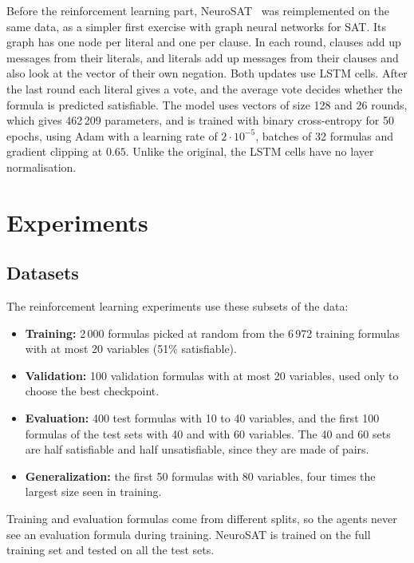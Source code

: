 \documentclass[11pt,a4paper]{article}
\begin{document}
Before the reinforcement learning part, NeuroSAT~\cite{selsam2019neurosat} was reimplemented on the same data, as a simpler first exercise with graph neural networks for SAT. Its graph has one node per literal and one per clause. In each round, clauses add up messages from their literals, and literals add up messages from their clauses and also look at the vector of their own negation. Both updates use LSTM cells. After the last round each literal gives a vote, and the average vote decides whether the formula is predicted satisfiable. The model uses vectors of size 128 and 26 rounds, which gives 462\,209 parameters, and is trained with binary cross-entropy for 50 epochs, using Adam with a learning rate of $2 \cdot 10^{-5}$, batches of 32 formulas and gradient clipping at $0.65$. Unlike the original, the LSTM cells have no layer normalisation.

\section{Experiments}
\label{sec:experiments}

\subsection{Datasets}

The reinforcement learning experiments use these subsets of the data:

\begin{itemize}
    \item \textbf{Training:} 2\,000 formulas picked at random from the 6\,972 training formulas with at most 20 variables (51\% satisfiable).
    \item \textbf{Validation:} 100 validation formulas with at most 20 variables, used only to choose the best checkpoint.
    \item \textbf{Evaluation:} 400 test formulas with 10 to 40 variables, and the first 100 formulas of the test sets with 40 and with 60 variables. The 40 and 60 sets are half satisfiable and half unsatisfiable, since they are made of pairs.
    \item \textbf{Generalization:} the first 50 formulas with 80 variables, four times the largest size seen in training.
\end{itemize}

Training and evaluation formulas come from different splits, so the agents never see an evaluation formula during training. NeuroSAT is trained on the full training set and tested on all the test sets.
\end{document}
